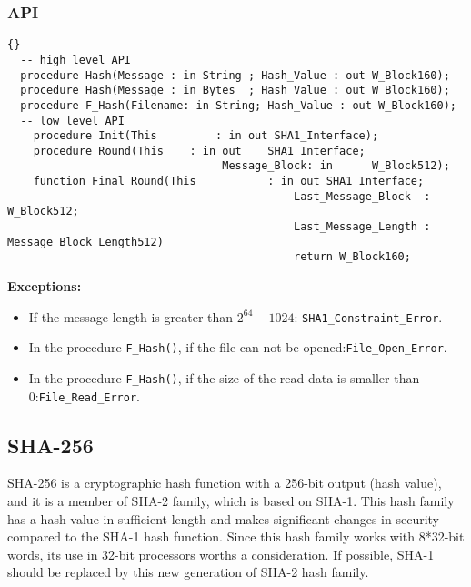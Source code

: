 \subsubsection*{API}
\begin{lstlisting}{}
  -- high level API
  procedure Hash(Message : in String ; Hash_Value : out W_Block160);
  procedure Hash(Message : in Bytes  ; Hash_Value : out W_Block160);
  procedure F_Hash(Filename: in String; Hash_Value : out W_Block160);
  -- low level API
	procedure Init(This 		: in out SHA1_Interface);
	procedure Round(This 	: in out 	SHA1_Interface;
								 Message_Block: in 		W_Block512);
	function Final_Round(This 		    : in out SHA1_Interface;
											Last_Message_Block  : W_Block512;
											Last_Message_Length : Message_Block_Length512)
											return W_Block160;
\end{lstlisting}
\textbf{Exceptions:}
\begin{itemize}
\item If the message length is greater than $2^{64}-1024$:\quad
  \texttt{SHA1\_Constraint\_Error}.
\item In the procedure \texttt{F\_Hash()}, if the file can not be
  opened:\quad\texttt{File\_Open\_Error}.
 \item In the procedure \texttt{F\_Hash()}, if the size of the read
   data is smaller than 0:\quad\texttt{File\_Read\_Error}.
\end{itemize}

\subsection{SHA-256}
SHA-256 is a cryptographic hash function with a 256-bit output (hash
value), and it is a member of SHA-2 family, which is based on
SHA-1. This hash family has a hash value in sufficient length and
makes significant changes in security compared to the SHA-1 hash
function. Since this hash family works with 8*32-bit words, its use in
32-bit processors worths a consideration. If possible, SHA-1 should be
replaced by this new generation of SHA-2 hash family.
